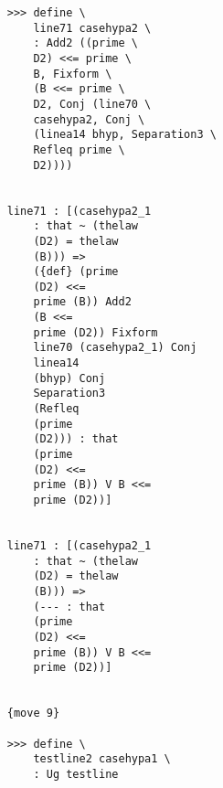 \documentclass[12pt]{article}
\begin{document}
\begin{verbatim}
                              >>> define \
                                  line71 casehypa2 \
                                  : Add2 ((prime \
                                  D2) <<= prime \
                                  B, Fixform \
                                  (B <<= prime \
                                  D2, Conj (line70 \
                                  casehypa2, Conj \
                                  (linea14 bhyp, Separation3 \
                                  Refleq prime \
                                  D2))))


                              line71 : [(casehypa2_1 
                                  : that ~ (thelaw 
                                  (D2) = thelaw 
                                  (B))) => 
                                  ({def} (prime 
                                  (D2) <<= 
                                  prime (B)) Add2 
                                  (B <<= 
                                  prime (D2)) Fixform 
                                  line70 (casehypa2_1) Conj 
                                  linea14 
                                  (bhyp) Conj 
                                  Separation3 
                                  (Refleq 
                                  (prime 
                                  (D2))) : that 
                                  (prime 
                                  (D2) <<= 
                                  prime (B)) V B <<= 
                                  prime (D2))]


                              line71 : [(casehypa2_1 
                                  : that ~ (thelaw 
                                  (D2) = thelaw 
                                  (B))) => 
                                  (--- : that 
                                  (prime 
                                  (D2) <<= 
                                  prime (B)) V B <<= 
                                  prime (D2))]


                              {move 9}

                              >>> define \
                                  testline2 casehypa1 \
                                  : Ug testline



\end{verbatim}
\end{document}
